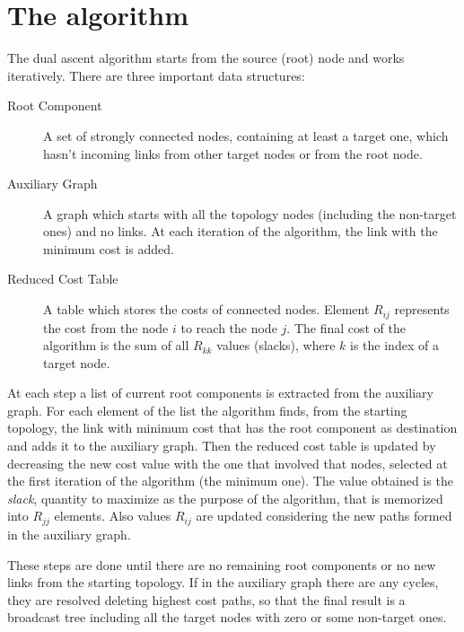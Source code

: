 \section{The algorithm}\label{sec:algorithm}

The dual ascent algorithm starts from the source (root) node and works
iteratively. There are three important data structures:

\begin{description}
	\item[Root Component] A set of strongly connected nodes, containing at
		least a target one, which hasn't incoming links from other
		target nodes or from the root node.
	\item[Auxiliary Graph] A graph which starts with all the topology nodes
		(including the non-target ones) and no links. At each iteration
		of the algorithm, the link with the minimum cost is added.
	\item[Reduced Cost Table] A table which stores the
		costs of connected nodes. Element \(R_{ij}\) represents the cost
		from the node \(i\) to reach the node \(j\). The final
		cost of the algorithm is the sum of all \(R_{kk}\) values
		(slacks), where \(k\) is the index of a target node.
\end{description}

At each step a list of current root components is extracted from the auxiliary
graph. For each element of the list the algorithm finds, from the starting
topology, the link with minimum cost that has the root component as destination
and adds it to the auxiliary graph. Then the reduced cost table is updated by
decreasing the new cost value with the one that involved that nodes, selected at
the first iteration of the algorithm (the minimum one). The value obtained is
the \emph{slack}, quantity to maximize as the purpose of the algorithm, that is
memorized into \(R_{jj}\) elements. Also values \(R_{ij}\) are updated
considering the new paths formed in the auxiliary graph.

These steps are done until there are no remaining root components or no new
links from the starting topology. If in the auxiliary graph there are any
cycles, they are resolved deleting highest cost paths, so that the final result
is a broadcast tree including all the target nodes with zero or some non-target
ones.
